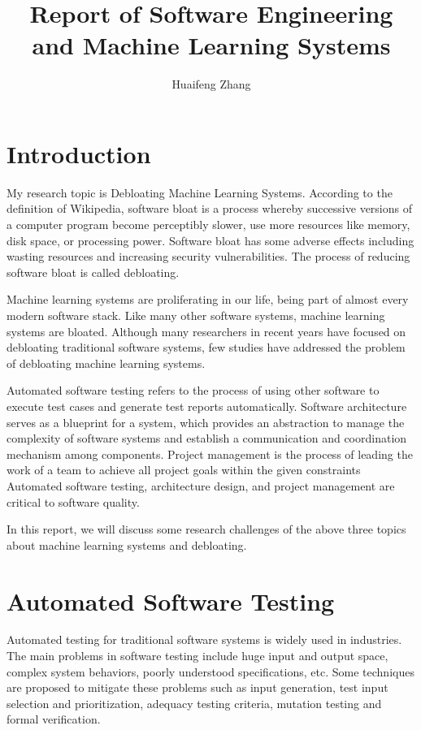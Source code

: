 \documentclass[11pt, a4paper]{article}
\title{Report of Software Engineering and Machine Learning Systems}
\author{Huaifeng Zhang}
\date{}
\begin{document}
\maketitle
 

\section{Introduction}
My research topic is Debloating Machine Learning Systems. According to the definition of Wikipedia, software bloat is a process whereby 
successive versions of a computer program become perceptibly slower, 
use more resources like memory, disk space, or processing power. 
Software bloat has some adverse effects 
including wasting resources and increasing security vulnerabilities. 
The process of reducing software bloat is called debloating.

Machine learning systems are proliferating in our life, 
being part of almost every modern software stack. 
Like many other software systems, machine learning systems are bloated. 
Although many researchers in recent years have focused on
debloating traditional software systems, few studies have 
addressed the problem of debloating machine learning systems.

Automated software testing refers to the process of using other software to
execute test cases and generate test reports automatically. 
Software architecture serves as a blueprint for a system,
which provides an abstraction to manage the complexity of software systems
and establish a communication and coordination mechanism among components.
Project management is the process of leading the work of a team to achieve all project goals within the given constraints
Automated software testing, architecture design, and project management are critical to software quality.


In this report, we will discuss some research challenges of the above three topics about machine learning systems and debloating.

\section{Automated Software Testing}
Automated testing for traditional software systems is widely used in industries.
The main problems in software testing include huge input and output space, complex system behaviors, poorly understood specifications, etc.
Some techniques are proposed to mitigate these problems such as input generation,
test input selection and prioritization, adequacy testing criteria, mutation testing
and formal verification.
\end{document}
